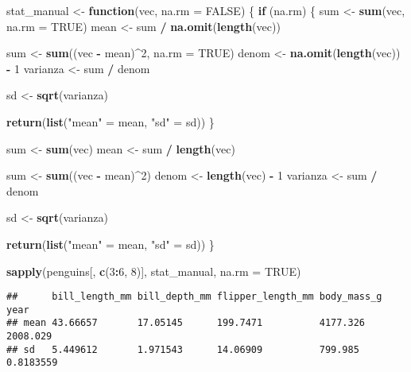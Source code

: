 \documentclass[
]{article}
\newenvironment{Shaded}{\begin{snugshade}}{\end{snugshade}}
\newcommand{\AttributeTok}[1]{\textcolor[rgb]{0.13,0.29,0.53}{#1}}
\newcommand{\ConstantTok}[1]{\textcolor[rgb]{0.56,0.35,0.01}{#1}}
\newcommand{\ControlFlowTok}[1]{\textcolor[rgb]{0.13,0.29,0.53}{\textbf{#1}}}
\newcommand{\DecValTok}[1]{\textcolor[rgb]{0.00,0.00,0.81}{#1}}
\newcommand{\FunctionTok}[1]{\textcolor[rgb]{0.13,0.29,0.53}{\textbf{#1}}}
\newcommand{\NormalTok}[1]{#1}
\newcommand{\OtherTok}[1]{\textcolor[rgb]{0.56,0.35,0.01}{#1}}
\newcommand{\SpecialCharTok}[1]{\textcolor[rgb]{0.81,0.36,0.00}{\textbf{#1}}}
\newcommand{\StringTok}[1]{\textcolor[rgb]{0.31,0.60,0.02}{#1}}
\begin{document}
\begin{Shaded}
\begin{Highlighting}[]
\NormalTok{stat\_manual }\OtherTok{\textless{}{-}} \ControlFlowTok{function}\NormalTok{(vec, }\AttributeTok{na.rm =} \ConstantTok{FALSE}\NormalTok{) \{}
  \ControlFlowTok{if}\NormalTok{ (na.rm) \{}
\NormalTok{    sum }\OtherTok{\textless{}{-}} \FunctionTok{sum}\NormalTok{(vec, }\AttributeTok{na.rm =} \ConstantTok{TRUE}\NormalTok{)}
\NormalTok{    mean }\OtherTok{\textless{}{-}}\NormalTok{ sum }\SpecialCharTok{/} \FunctionTok{na.omit}\NormalTok{(}\FunctionTok{length}\NormalTok{(vec))}

\NormalTok{    sum }\OtherTok{\textless{}{-}} \FunctionTok{sum}\NormalTok{((vec }\SpecialCharTok{{-}}\NormalTok{ mean)}\SpecialCharTok{\^{}}\DecValTok{2}\NormalTok{, }\AttributeTok{na.rm =} \ConstantTok{TRUE}\NormalTok{)}
\NormalTok{    denom }\OtherTok{\textless{}{-}} \FunctionTok{na.omit}\NormalTok{(}\FunctionTok{length}\NormalTok{(vec)) }\SpecialCharTok{{-}} \DecValTok{1}
\NormalTok{    varianza }\OtherTok{\textless{}{-}}\NormalTok{ sum }\SpecialCharTok{/}\NormalTok{ denom}

\NormalTok{    sd }\OtherTok{\textless{}{-}} \FunctionTok{sqrt}\NormalTok{(varianza)}

    \FunctionTok{return}\NormalTok{(}\FunctionTok{list}\NormalTok{(}\StringTok{"mean"} \OtherTok{=}\NormalTok{ mean, }\StringTok{"sd"} \OtherTok{=}\NormalTok{ sd))}
\NormalTok{  \}}

\NormalTok{  sum }\OtherTok{\textless{}{-}} \FunctionTok{sum}\NormalTok{(vec)}
\NormalTok{  mean }\OtherTok{\textless{}{-}}\NormalTok{ sum }\SpecialCharTok{/} \FunctionTok{length}\NormalTok{(vec)}

\NormalTok{  sum }\OtherTok{\textless{}{-}} \FunctionTok{sum}\NormalTok{((vec }\SpecialCharTok{{-}}\NormalTok{ mean)}\SpecialCharTok{\^{}}\DecValTok{2}\NormalTok{)}
\NormalTok{  denom }\OtherTok{\textless{}{-}} \FunctionTok{length}\NormalTok{(vec) }\SpecialCharTok{{-}} \DecValTok{1}
\NormalTok{  varianza }\OtherTok{\textless{}{-}}\NormalTok{ sum }\SpecialCharTok{/}\NormalTok{ denom}

\NormalTok{  sd }\OtherTok{\textless{}{-}} \FunctionTok{sqrt}\NormalTok{(varianza)}

  \FunctionTok{return}\NormalTok{(}\FunctionTok{list}\NormalTok{(}\StringTok{"mean"} \OtherTok{=}\NormalTok{ mean, }\StringTok{"sd"} \OtherTok{=}\NormalTok{ sd))}
\NormalTok{\}}

\FunctionTok{sapply}\NormalTok{(penguins[, }\FunctionTok{c}\NormalTok{(}\DecValTok{3}\SpecialCharTok{:}\DecValTok{6}\NormalTok{, }\DecValTok{8}\NormalTok{)], stat\_manual, }\AttributeTok{na.rm =} \ConstantTok{TRUE}\NormalTok{)}
\end{Highlighting}
\end{Shaded}

\begin{verbatim}
##      bill_length_mm bill_depth_mm flipper_length_mm body_mass_g year     
## mean 43.66657       17.05145      199.7471          4177.326    2008.029 
## sd   5.449612       1.971543      14.06909          799.985     0.8183559
\end{verbatim}
\end{document}
